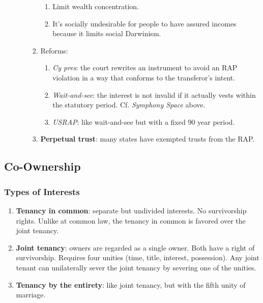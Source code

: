 \begin{enumerate}
\begin{enumerate}
\begin{enumerate}
\begin{enumerate}
                \item Limit wealth concentration.
                \item It's socially undesirable for people to have assured 
                incomes because it limits social Darwinism.
            \end{enumerate}
            \item Reforms:
            \begin{enumerate}
                \item \emph{Cy pres}: the court rewrites an instrument to 
                avoid an RAP violation in a way that conforms to the 
                transferor's intent.
                \item \emph{Wait-and-see}: the interest is not invalid if it 
                actually vests within the statutory period. Cf. \emph{Symphony 
                Space} above.
                \item \emph{USRAP}: like wait-and-see but with a fixed 90 year 
                period.
            \end{enumerate}
            \item \textbf{Perpetual trust}: many states have exempted trusts 
            from the RAP.
        \end{enumerate}
    \end{enumerate}
\end{enumerate}

\subsection{Co-Ownership}

\subsubsection{Types of Interests}

\begin{enumerate}
    \item \textbf{Tenancy in common}: separate but undivided interests. No 
    survivorship rights. Unlike at common law, the tenancy in common is 
    favored over the joint tenancy.
    \item \textbf{Joint tenancy}: owners are regarded as a single owner. Both 
    have a right of survivorship. Requires four unities (time, title, 
    interest, possession). Any joint tenant can unilaterally sever the joint 
    tenancy by severing one of the unities.
    \item \textbf{Tenancy by the entirety}: like joint tenancy, but with the 
    fifth unity of marriage.
\end{enumerate}

